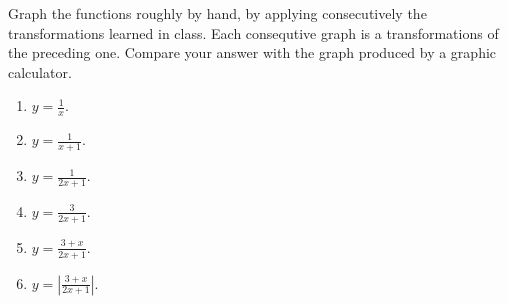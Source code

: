 Graph the functions roughly by hand, by applying consecutively the transformations learned in class. Each consequtive graph is a transformations of the preceding one. Compare your answer with the graph produced by a graphic calculator.
\begin{multicols}{2}
\begin{enumerate}
\item $\displaystyle y=\frac{1}{x}$.
\item $\displaystyle y=\frac{1}{x+1}$.
\item $\displaystyle y=\frac{1}{2x+1}$.
\item $\displaystyle y=\frac{3}{2x+1}$.
\item $\displaystyle y=\frac{3+x}{2x+1}$.
\item $\displaystyle y=\left|\frac{3+x}{2x+1}\right|$.
\end{enumerate}
\end{multicols}
